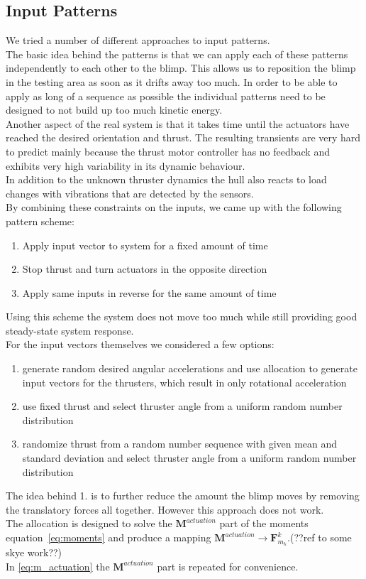 \subsection{Input Patterns}
\label{sub:input_pattern}
We tried a number of different approaches to input patterns. \\
The basic idea behind the patterns is that we can apply each of these patterns independently to each other to the blimp.
This allows us to reposition the blimp in the testing area as soon as it drifts away too much.
In order to be able to apply as long of a sequence as possible the individual patterns need to be designed to not build up too much kinetic energy.\\
Another aspect of the real system is that it takes time until the actuators have reached the desired orientation and thrust.
The resulting transients are very hard to predict mainly because the thrust motor controller has no feedback and exhibits very high variability in its dynamic behaviour. \\
In addition to the unknown thruster dynamics the hull also reacts to load changes with vibrations that are detected by the sensors. \\
By combining these constraints on the inputs, we came up with the following pattern scheme:
\begin{enumerate}
\item Apply input vector to system for a fixed amount of time
\item Stop thrust and turn actuators in the opposite direction
\item Apply same inputs in reverse for the same amount of time
\end{enumerate}
Using this scheme the system does not move too much while still providing good steady-state system response. \\
For the input vectors themselves we considered a few options:\\
\begin{enumerate}
\item generate random desired angular accelerations and use allocation to generate input vectors for the thrusters, which result in only rotational acceleration
\item use fixed thrust and select thruster angle from a uniform random number distribution
\item randomize thrust from a random number sequence with given mean and standard deviation and select thruster angle from a uniform random number distribution
\end{enumerate}
The idea behind 1. is to further reduce the amount the blimp moves by removing the translatory forces all together. 
However this approach does not work.\\
The allocation is designed to solve the $\mathbf{M}^{actuation}$ part of the moments equation~\ref{eq:moments} and produce a mapping $\mathbf{M}^{actuation} \rightarrow \mathbf{F}^k_{m_k}$.(??ref to some skye work??)\\
In \ref{eq:m_actuation} the $\mathbf{M}^{actuation}$ part is repeated for convenience.

